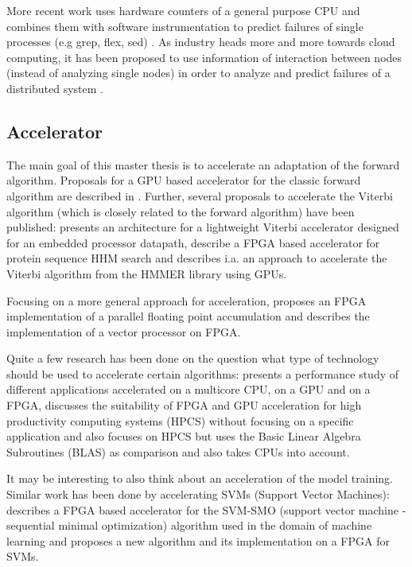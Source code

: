 \documentclass[12pt]{article} %
\begin{document}
More recent work uses hardware counters of a general purpose CPU and combines
them with software instrumentation to predict failures of single processes (e.g
grep, flex, sed) \cite{FSE10_Yilmaz,ozcelik14}. As industry heads more and more
towards cloud computing, it has been proposed to use information of interaction
between nodes (instead of analyzing single nodes) in order to analyze and
predict failures of a distributed system \cite{IEEE12_Salfner,DSN10_Oliner}.


\subsection{Accelerator} %

The main goal of this master thesis is to accelerate an adaptation of the
forward algorithm. Proposals for a GPU based accelerator for the classic
forward algorithm are described in \cite{neumann11,liu09}. Further, several
proposals to accelerate the Viterbi algorithm (which is closely related to the
forward algorithm) have been published: \cite{ASAP12_Azhar} presents an
architecture for a lightweight Viterbi accelerator designed for an embedded
processor datapath, \cite{IPDPS07_Jacob,ICS06_Maddimsetty,IPDPS07_Oliver}
describe a FPGA based accelerator for protein sequence HHM search and
\cite{IPDPS09_Walters} describes i.a. an approach to accelerate the Viterbi
algorithm from the HMMER library using GPUs.

Focusing on a more general approach for acceleration, \cite{ARITH13_Kadric}
proposes an FPGA implementation of a parallel floating point accumulation and
\cite{ITNG07_Hongyan} describes the implementation of a vector processor on
FPGA.

Quite a few research has been done on the question what type of technology
should be used to accelerate certain algorithms: \cite{SASP08_Che} presents
a performance study of different applications accelerated on a multicore CPU,
on a GPU and on a FPGA, \cite{FPL10_Jones} discusses the suitability of FPGA
and GPU acceleration for high productivity computing systems (HPCS) without
focusing on a specific application and \cite{ISVLSI10_Kestur} also focuses on
HPCS but uses the Basic Linear Algebra Subroutines (BLAS) as comparison and
also takes CPUs into account.

It may be interesting to also think about an acceleration of the model
training. Similar work has been done by accelerating SVMs (Support Vector Machines):
\cite{FCCM09_Cadambi} describes a FPGA based accelerator for the SVM-SMO
(support vector machine - sequential minimal optimization) algorithm used in
the domain of machine learning and \cite{IEEE03_Anguita} proposes a new algorithm
and its implementation on a FPGA for SVMs.
\end{document}
